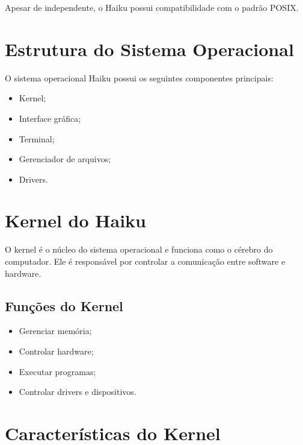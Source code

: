 \documentclass[12pt,a4paper]{article}
\begin{document}
Apesar de independente, o Haiku possui compatibilidade com o padrão POSIX.


\section{Estrutura do Sistema Operacional}

O sistema operacional Haiku possui os seguintes componentes principais:

\begin{itemize}
    \item Kernel;
    \item Interface gráfica;
    \item Terminal;
    \item Gerenciador de arquivos;
    \item Drivers.
\end{itemize}


\section{Kernel do Haiku}

O kernel é o núcleo do sistema operacional e funciona como o cérebro do computador.
Ele é responsável por controlar a comunicação entre software e hardware.

\subsection{Funções do Kernel}

\begin{itemize}
    \item Gerenciar memória;
    \item Controlar hardware;
    \item Executar programas;
    \item Controlar drivers e dispositivos.
\end{itemize}


\section{Características do Kernel}
\end{document}
